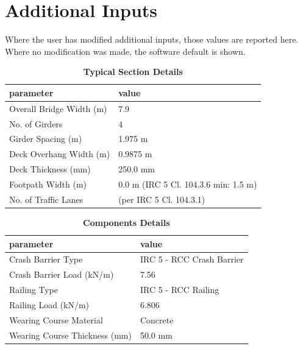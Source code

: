 \documentclass[12pt,a4paper]{report}
\numberwithin{table}{chapter}
\numberwithin{figure}{chapter}
\begin{document}
\newpage
\section{Additional Inputs}
\label{sec:additional-inputs}

Where the user has modified additional inputs, those values are reported here. Where no modification was made, the software default is shown.

\vspace{0.8cm}

\begin{longtable}{|L{5.5cm}|p{10.0cm}|}
\caption{\textbf{Typical Section Details}}
\hline
\textbf{parameter} & \textbf{value} \\
\hline
\textnormal{Overall Bridge Width (m)} & 7.9 \\[6pt]
\hline
\textnormal{No. of Girders} & 4 \\[6pt]
\hline
\textnormal{Girder Spacing (m)} & 1.975 m \\[6pt]
\hline
\textnormal{Deck Overhang Width (m)} & 0.9875 m \\[6pt]
\hline
\textnormal{Deck Thickness (mm)} & 250.0 mm \\[6pt]
\hline
\textnormal{Footpath Width (m)} & 0.0 m (IRC 5 Cl. 104.3.6 min: 1.5 m) \\[6pt]
\hline
\textnormal{No. of Traffic Lanes} &  (per IRC 5 Cl. 104.3.1) \\[6pt]
\hline
\end{longtable}

\vspace{0.8em}

\begin{longtable}{|L{5.5cm}|p{10.0cm}|}
\caption{\textbf{Components Details}}
\hline
\textbf{parameter} & \textbf{value} \\
\hline
\textnormal{Crash Barrier Type} & IRC 5 - RCC Crash Barrier \\[6pt]
\hline
\textnormal{Crash Barrier Load (kN/m)} & 7.56 \\[6pt]
\hline

\textnormal{Railing Type} & IRC 5 - RCC Railing \\[6pt]
\hline
\textnormal{Railing Load (kN/m)} & 6.806 \\[6pt]
\hline
\textnormal{Wearing Course Material} & Concrete \\[6pt]
\hline
\textnormal{Wearing Course Thickness (mm)} & 50.0 mm \\[6pt]
\hline
\end{longtable}
\end{document}
